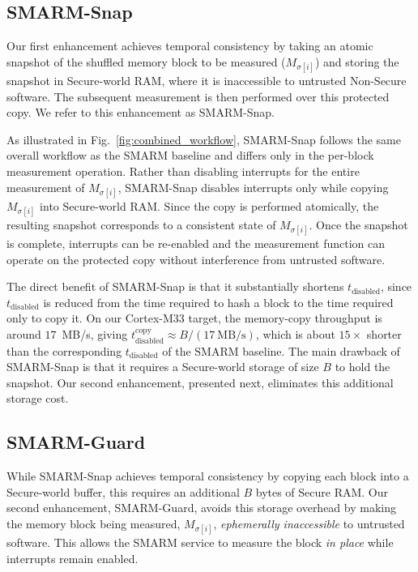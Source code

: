 \documentclass[conference]{IEEEtran}
\newcommand{\tdis}{$t_{\mathrm{disabled}}$\xspace}
\newcommand{\smarmcopy}{SMARM-Snap\xspace}
\newcommand{\smarmlock}{SMARM-Guard\xspace}
\begin{document}
\subsection{\smarmcopy}
\label{sec:atomic}

Our first enhancement achieves temporal consistency by taking an atomic snapshot of the shuffled memory block to be measured ($M_{\sigma[i]}$) and storing the snapshot in Secure-world RAM, where it is inaccessible to untrusted Non-Secure software. The subsequent measurement is then performed over this protected copy. We refer to this enhancement as \smarmcopy.

As illustrated in Fig.~\ref{fig:combined_workflow}, \smarmcopy follows the same overall workflow as the SMARM baseline and differs only in the per-block measurement operation. Rather than disabling interrupts for the entire measurement of $M_{\sigma[i]}$, \smarmcopy disables interrupts only while copying $M_{\sigma[i]}$ into Secure-world RAM.
Since the copy is performed atomically, the resulting snapshot corresponds to a consistent state of $M_{\sigma[i]}$.
Once the snapshot is complete, interrupts can be re-enabled and the measurement function can operate on the protected copy without interference from untrusted software.

The direct benefit of \smarmcopy is that it substantially shortens \tdis, since \tdis is reduced from the time required to hash a block to the time required only to copy it. On our Cortex-M33 target, the memory-copy throughput is around $17$~MB/s, giving
$t_{\mathrm{disabled}}^{\mathrm{copy}}\approx B/(17~\mathrm{MB/s})$, which is about $15\times$ shorter than the corresponding \tdis of the SMARM baseline.
%
The main drawback of \smarmcopy is that it requires a Secure-world storage of size 
$B$ to hold the snapshot. Our second enhancement, presented next, eliminates this additional storage cost.



\subsection{\smarmlock}
\label{sec:sau}

While \smarmcopy achieves temporal consistency by copying each block into a Secure-world buffer, this requires an additional $B$ bytes of Secure RAM. Our second enhancement, \smarmlock, avoids this storage overhead by making the memory block being measured, $M_{\sigma[i]}$, \emph{ephemerally inaccessible} to untrusted software.
This allows the SMARM service to measure the block \emph{in place} while interrupts remain enabled.
\end{document}
